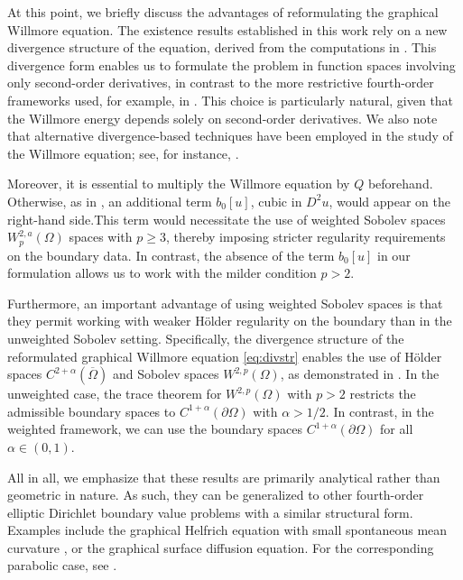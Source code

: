 \documentclass[12pt,a4paper,twoside]{article}
\begin{document}
At this point, we briefly discuss the advantages of reformulating the graphical Willmore equation. The existence results established in this work rely on a new divergence structure of the equation, derived from the computations in \cite{deckelnick2006error, koch2012geometric}.
This divergence form enables us to formulate the problem in function spaces involving only second-order derivatives, in contrast to the more restrictive fourth-order frameworks used, for example, in \cite{nitsche1993boundary}. This choice is particularly natural, given that the Willmore energy depends solely on second-order derivatives. We also note that alternative divergence-based techniques have been employed in the study of the Willmore equation; see, for instance, \cite{riviere2008analysis}.

Moreover, it is essential to multiply the Willmore equation by $Q$  beforehand. Otherwise, as in \cite[p. 215, Lemma 3.2]{koch2012geometric}, an additional term $b_0[u]$, cubic in $D^2u$, would appear on the right-hand side.This term would necessitate the use of weighted Sobolev spaces ${W^{2,a}_p(\Omega)}$ spaces with $p\ge3$, thereby imposing stricter regularity requirements on the boundary data. In contrast, the absence of the term $b_0[u]$ in our formulation allows us to work with the milder condition $p>2$.

Furthermore, an important advantage of using weighted Sobolev spaces is that they permit working with weaker Hölder regularity on the boundary than in the unweighted Sobolev setting. Specifically, the divergence structure of the reformulated graphical Willmore equation \eqref{eq:divstr} enables the use of Hölder spaces $C^{2+\alpha}(\overline\Omega)$ and Sobolev spaces $W^{2,p}(\Omega)$, as demonstrated in \cite[Subsections 5.2 and 5.3]{gulyak2024boundary}. In the unweighted case, the trace theorem for $W^{2,p}(\Omega)$ with $p>2$ restricts the admissible boundary spaces to $C^{1+\alpha}(\partial\Omega)$ with $\alpha>1/2$. In contrast, in the weighted framework, we can use the boundary spaces $C^{1+\alpha}(\partial\Omega)$ for all $ \alpha\in (0,1)$.

All in all, we emphasize that these results are primarily analytical rather than geometric in nature. As such, they can be generalized to other fourth-order elliptic Dirichlet boundary value problems with a similar structural form. Examples include the graphical Helfrich equation with small spontaneous mean curvature \cite{helfrich1973elastic}, or the graphical surface diffusion equation. For the corresponding parabolic case, see \cite[p. 216, Lemma 3.3]{koch2012geometric}.
\end{document}
